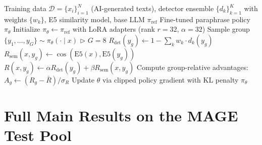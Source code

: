 \documentclass[11pt]{article}
\begin{document}
\begin{algorithm}[H]
\caption{StealthRL Training}
\label{alg:stealthrl}
\begin{algorithmic}[1]
\REQUIRE Training data $\mathcal{D} = \{x_i\}_{i=1}^N$ (AI-generated texts), detector ensemble $\{d_k\}_{k=1}^K$ with weights $\{w_k\}$, E5 similarity model, base LLM $\pi_{\text{ref}}$
\ENSURE Fine-tuned paraphrase policy $\pi_\theta$
\STATE Initialize $\pi_\theta \leftarrow \pi_{\text{ref}}$ with LoRA adapters (rank $r{=}32$, $\alpha{=}32$)
      \STATE Sample group $\{y_1, \ldots, y_G\} \sim \pi_\theta(\cdot \mid x)$ \hfill $\triangleright$ $G{=}8$
        \STATE $R_{\text{det}}(y_g) \leftarrow 1 - \sum_{k} w_k \cdot d_k(y_g)$
        \STATE $R_{\text{sem}}(x, y_g) \leftarrow \cos(\text{E5}(x), \text{E5}(y_g))$
        \STATE $R(x, y_g) \leftarrow \alpha R_{\text{det}}(y_g) + \beta R_{\text{sem}}(x, y_g)$
      \ENDFOR
      \STATE Compute group-relative advantages: $A_g \leftarrow (R_g - \bar{R}) / \sigma_R$
    \ENDFOR
    \STATE Update $\theta$ via clipped policy gradient with KL penalty
  \ENDFOR
\ENDFOR
\RETURN $\pi_\theta$
\end{algorithmic}
\end{algorithm}

\FloatBarrier
\section{Full Main Results on the MAGE Test Pool}
\label{app:mainresults}

\begin{center}
\small
\setlength{\tabcolsep}{4pt}
\resizebox{\columnwidth}{!}{%
  
}
\label{tab:app_main_binoc}
\end{center}

\begin{center}
\small
\setlength{\tabcolsep}{4pt}
\resizebox{\columnwidth}{!}{%
  
}
\label{tab:app_main_fastd}
\end{center}
\end{document}
